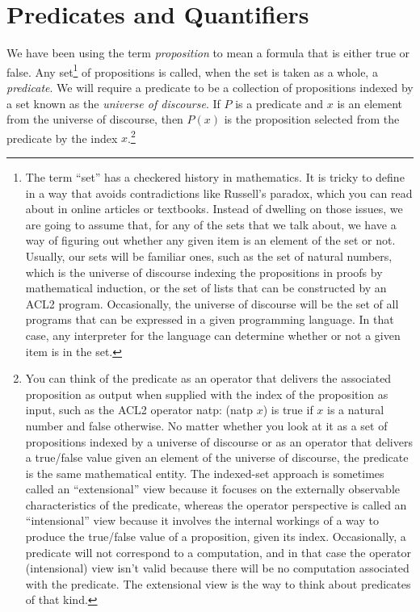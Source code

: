 {{\begin{exercises}
\end{exercises}


\section{Predicates and Quantifiers}
\label{sec:predicates-and-quantifiers}

\label{proposition-def}
We have been using the term \emph{proposition}
to mean a formula that is either true or false.
Any set\footnote{The
term
``set'' has a checkered history in mathematics.
It is tricky to define in a way that avoids contradictions
like Russell's paradox, which you can read about
in online articles or textbooks.
Instead of dwelling on those issues,
we are going to assume that,
for any of the sets that we talk about,
we have a way of figuring out whether any given
item is an element of the set or not.
Usually, our sets will be familiar ones,
such as the set of natural numbers, which
is the universe of discourse indexing the propositions
in proofs by mathematical induction, or
the set of lists that can be constructed
by an ACL2 program.
Occasionally, the universe of discourse will be
the set of all programs that can be expressed in a given
programming language.
In that case,
any interpreter for the language
can determine whether or
not a given item is in the set.}
of propositions is called,
when the set is taken as a whole, a
\label{predicate-def}\emph{predicate}.
We will require a predicate
to be a collection of propositions
indexed by a set known as the
\label{def-universe-of-discourse}\emph{universe of discourse}.
If $P$ is a predicate and $x$ is an element from
the universe of discourse, then $P(x)$ is
the proposition
selected from the predicate by the index $x$.\footnote{You
can think of the predicate as an
operator that delivers the associated proposition as output
when supplied with the index of the proposition as input,
such as the ACL2 operator natp: (natp $x$) is true if
$x$ is a natural number and false otherwise.
No matter whether you look at it as a set of propositions
indexed by a universe of discourse or as an operator that
delivers a true/false value given an element of the universe of discourse,
the predicate is the same mathematical entity.
The indexed-set approach is sometimes called an ``extensional'' view
because it focuses on the externally observable characteristics of the predicate,
whereas the operator perspective is called an ``intensional'' view
because it involves the internal workings of a way to produce the true/false value
of a proposition, given its index.
Occasionally, a predicate will not correspond to a computation,
and in that case the operator (intensional) view
isn't valid because there will be no
computation associated with the predicate.
The extensional view is the way
to think about predicates of that kind.}

}}
